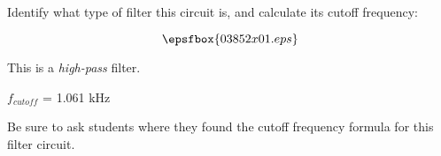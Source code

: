 

Identify what type of filter this circuit is, and calculate its cutoff frequency:

$$\epsfbox{03852x01.eps}$$







This is a {\it high-pass} filter.

\vskip 10pt

$f_{cutoff}$ = 1.061 kHz







Be sure to ask students where they found the cutoff frequency formula for this filter circuit.





